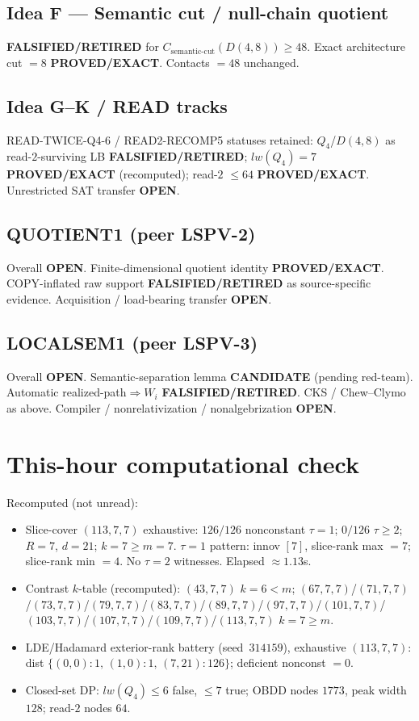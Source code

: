 \documentclass[11pt]{article}
\begin{document}
\subsection*{Idea F --- Semantic cut / null-chain quotient}
\textbf{FALSIFIED/RETIRED} for $C_{\mathrm{semantic\textrm{-}cut}}(D(4,8))\ge48$.
Exact architecture cut $=8$ \textbf{PROVED/EXACT}. Contacts $=48$ unchanged.

\subsection*{Idea G--K / READ tracks}
READ-TWICE-Q4-6 / READ2-RECOMP5 statuses retained: $Q_4$/$D(4,8)$ as read-$2$-surviving LB
\textbf{FALSIFIED/RETIRED}; $lw(Q_4)=7$ \textbf{PROVED/EXACT} (recomputed); read-$2$ $\le64$
\textbf{PROVED/EXACT}. Unrestricted SAT transfer \textbf{OPEN}.

\subsection*{QUOTIENT1 (peer LSPV-2)}
Overall \textbf{OPEN}. Finite-dimensional quotient identity \textbf{PROVED/EXACT}.
COPY-inflated raw support \textbf{FALSIFIED/RETIRED} as source-specific evidence.
Acquisition / load-bearing transfer \textbf{OPEN}.

\subsection*{LOCALSEM1 (peer LSPV-3)}
Overall \textbf{OPEN}. Semantic-separation lemma \textbf{CANDIDATE} (pending red-team).
Automatic realized-path$\Rightarrow W_i$ \textbf{FALSIFIED/RETIRED}.
CKS / Chew--Clymo as above. Compiler / nonrelativization / nonalgebrization \textbf{OPEN}.

\section*{This-hour computational check}
Recomputed (not unread):
\begin{itemize}
\item Slice-cover $(113,7,7)$ exhaustive: $126/126$ nonconstant $\tau{=}1$;
  $0/126$ $\tau{\ge}2$; $R{=}7$, $d{=}21$; $k{=}7{\ge}m{=}7$.
  $\tau{=}1$ pattern: innov $[7]$, slice-rank max $=7$; slice-rank min $=4$.
  No $\tau{=}2$ witnesses. Elapsed $\approx1.13$s.
\item Contrast $k$-table (recomputed): $(43,7,7)$ $k{=}6{<}m$;
  $(67,7,7)$/$(71,7,7)$/$(73,7,7)$/$(79,7,7)$/$(83,7,7)$/$(89,7,7)$/$(97,7,7)$/$(101,7,7)$/$(103,7,7)$/$(107,7,7)$/$(109,7,7)$/$(113,7,7)$ $k{=}7{\ge}m$.
\item LDE/Hadamard exterior-rank battery (seed~$314159$), exhaustive $(113,7,7)$:
  dist $\{(0,0){:}1,\,(1,0){:}1,\,(7,21){:}126\}$; deficient nonconst $=0$.
\item Closed-set DP: $lw(Q_4)\le6$ false, $\le7$ true; OBDD nodes $1773$, peak width $128$;
  read-$2$ nodes $64$.
\end{itemize}
\end{document}
